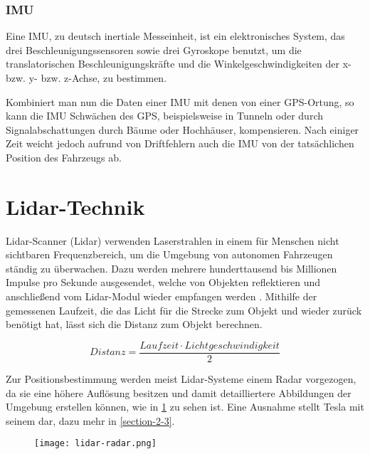 \subsubsection{\acl{IMU}}

Eine \ac{IMU}, zu deutsch inertiale Messeinheit, ist ein elektronisches System, das drei Beschleunigungssensoren sowie drei Gyroskope benutzt, um die translatorischen Beschleunigungskräfte und die Winkelgeschwindigkeiten der x- bzw. y- bzw. z-Achse, zu bestimmen. 

Kombiniert man nun die Daten einer \ac{IMU} mit denen von einer \ac{GPS}-Ortung, so kann die \ac{IMU} Schwächen des \ac{GPS}, beispielsweise in Tunneln oder durch Signalabschattungen durch Bäume oder Hochhäuser, kompensieren. Nach einiger Zeit weicht jedoch aufrund von Driftfehlern auch die \ac{IMU} von der tatsächlichen Position des Fahrzeugs ab. 


\section{Lidar-Technik}

\acs{Lidar}-Scanner (\acl{Lidar}) verwenden Laserstrahlen in einem für Menschen nicht sichtbaren Frequenzbereich, um die Umgebung von autonomen Fahrzeugen ständig zu überwachen. Dazu werden mehrere hunderttausend bis Millionen Impulse pro Sekunde ausgesendet, welche von Objekten reflektieren und anschließend vom \acs{Lidar}-Modul wieder empfangen werden . Mithilfe der gemessenen Laufzeit, die das Licht für die Strecke zum Objekt und wieder zurück benötigt hat, lässt sich die Distanz zum Objekt berechnen.

\begin{equation}
  Distanz = \frac{Laufzeit \cdot Lichtgeschwindigkeit}{2}
\end{equation}
\vspace{0.3cm}

Zur Positionsbestimmung werden meist \acs{Lidar}-Systeme einem \acs{Radar} vorgezogen, da sie eine höhere Auflösung besitzen und damit detailliertere Abbildungen der Umgebung erstellen können, wie in \ref{lidar-radar} zu sehen ist. Eine Ausnahme stellt Tesla mit seinem  dar, dazu mehr in \ref{section-2-3}.

\begin{figure}\centering
  \texttt{[image: lidar-radar.png]}
  \label{lidar-radar}
\end{figure}

